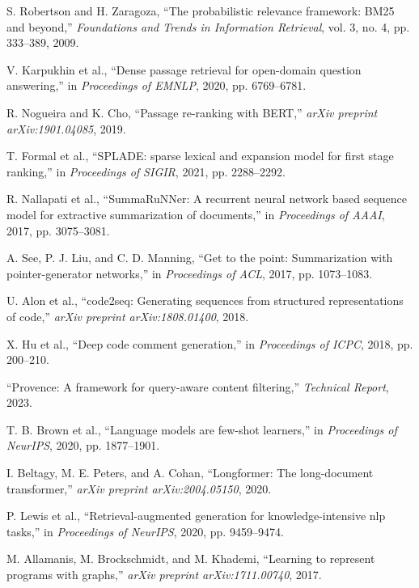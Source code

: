 \documentclass[conference]{IEEEtran}
\begin{document}
\begin{thebibliography}{99}
S. Robertson and H. Zaragoza, ``The probabilistic relevance framework: BM25 and beyond,'' \emph{Foundations and Trends in Information Retrieval}, vol. 3, no. 4, pp. 333--389, 2009.

V. Karpukhin et al., ``Dense passage retrieval for open-domain question answering,'' in \emph{Proceedings of EMNLP}, 2020, pp. 6769--6781.

R. Nogueira and K. Cho, ``Passage re-ranking with BERT,'' \emph{arXiv preprint arXiv:1901.04085}, 2019.

T. Formal et al., ``SPLADE: sparse lexical and expansion model for first stage ranking,'' in \emph{Proceedings of SIGIR}, 2021, pp. 2288--2292.

R. Nallapati et al., ``SummaRuNNer: A recurrent neural network based sequence model for extractive summarization of documents,'' in \emph{Proceedings of AAAI}, 2017, pp. 3075--3081.

A. See, P. J. Liu, and C. D. Manning, ``Get to the point: Summarization with pointer-generator networks,'' in \emph{Proceedings of ACL}, 2017, pp. 1073--1083.

U. Alon et al., ``code2seq: Generating sequences from structured representations of code,'' \emph{arXiv preprint arXiv:1808.01400}, 2018.

X. Hu et al., ``Deep code comment generation,'' in \emph{Proceedings of ICPC}, 2018, pp. 200--210.

``Provence: A framework for query-aware content filtering,'' \emph{Technical Report}, 2023.

T. B. Brown et al., ``Language models are few-shot learners,'' in \emph{Proceedings of NeurIPS}, 2020, pp. 1877--1901.

I. Beltagy, M. E. Peters, and A. Cohan, ``Longformer: The long-document transformer,'' \emph{arXiv preprint arXiv:2004.05150}, 2020.

P. Lewis et al., ``Retrieval-augmented generation for knowledge-intensive nlp tasks,'' in \emph{Proceedings of NeurIPS}, 2020, pp. 9459--9474.

M. Allamanis, M. Brockschmidt, and M. Khademi, ``Learning to represent programs with graphs,'' \emph{arXiv preprint arXiv:1711.00740}, 2017.


\end{thebibliography}
\end{document}
